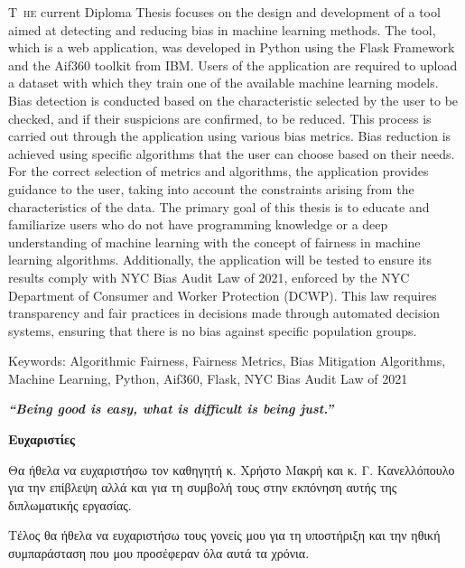 \documentclass[12pt,twoside]{article}
\newcommand{\en}{\selectlanguage{english}}
\newcommand{\gr}{\selectlanguage{greek}}
\begin{document}
\lettrine [loversize = 0.03] {\en T} {\ he} current Diploma Thesis focuses on the design and development of a tool aimed at detecting and reducing bias in machine learning methods. The tool, which is a web application, was developed in Python using the Flask Framework and the Aif360 toolkit from IBM. Users of the application are required to upload a dataset with which they train one of the available machine learning models. Bias detection is conducted based on the characteristic selected by the user to be checked, and if their suspicions are confirmed, to be reduced. This process is carried out through the application using various bias metrics. Bias reduction is achieved using specific algorithms that the user can choose based on their needs. For the correct selection of metrics and algorithms, the application provides guidance to the user, taking into account the constraints arising from the characteristics of the data. The primary goal of this thesis is to educate and familiarize users who do not have programming knowledge or a deep understanding of machine learning with the concept of fairness in machine learning algorithms. Additionally, the application will be tested to ensure its results comply with NYC Bias Audit Law of 2021, enforced by the NYC Department of Consumer and Worker Protection (DCWP). This law requires transparency and fair practices in decisions made through automated decision systems, ensuring that there is no bias against specific population groups.
\\
\par{\large{\en Keywords: Algorithmic Fairness, Fairness Metrics, Bias Mitigation Algorithms, Machine Learning, Python, Aif360, Flask, NYC Bias Audit Law of 2021}}

\newpage\null
\thispagestyle{plain}
\vspace*{\fill}
\begin{center}
\begin{minipage}{.6\textwidth}
\centering \textbf{\en\textit{ “Being good is easy, what is difficult is being just.”}
}%
\end{minipage}
\end{center}
\vfill

\newpage
\thispagestyle{plain}
\par{\Large{ \textbf{\gr Ευχαριστίες}}}
\par{}
\gr Θα ήθελα να ευχαριστήσω τον καθηγητή  κ. Χρήστο Μακρή και κ. Γ. Κανελλόπουλο για την επίβλεψη  αλλά και για τη συμβολή τους στην εκπόνηση αυτής της διπλωματικής εργασίας.
\par{}
Τέλος θα ήθελα να ευχαριστήσω τους γονείς μου για τη υποστήριξη και την ηθική συμπαράσταση που μου προσέφεραν όλα αυτά τα χρόνια.
\end{document}
